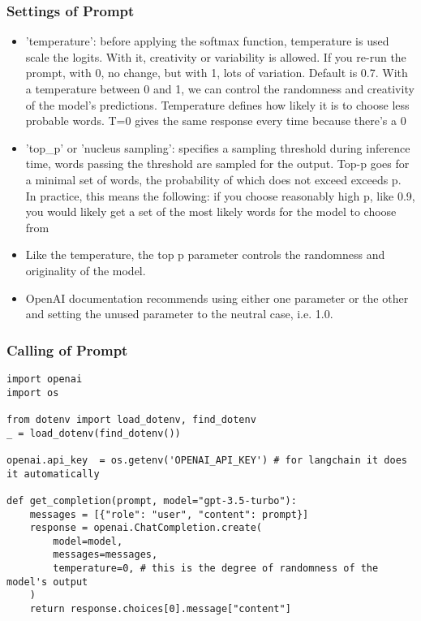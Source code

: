 \begin{frame}[fragile]\frametitle{Settings of Prompt}

\begin{itemize}
\item 'temperature':  before applying the softmax function, temperature is used scale the logits. With it, creativity or variability is allowed. If you re-run the prompt, with 0, no change, but with 1, lots of variation. Default is 0.7. With a temperature between 0 and 1, we can control the randomness and creativity of the model's predictions. Temperature defines how likely it is to choose less probable words. T=0 gives the same response every time because there's a 0%
\item 'top\_p' or 'nucleus sampling': specifies a sampling threshold during inference time, words passing the threshold are sampled for the output. Top-p goes for a minimal set of words, the probability of which does not exceed exceeds p. In practice, this means the following: if you choose reasonably high p, like 0.9, you would likely get a set of the most likely words for the model to choose from
\item Like the temperature, the top p parameter controls the randomness and originality of the model.
\item OpenAI documentation recommends using either one parameter or the other and setting the unused parameter to the neutral case, i.e. 1.0.
\end{itemize}
		
\end{frame}


\begin{frame}[fragile]\frametitle{Calling of Prompt}

\begin{lstlisting}
import openai
import os

from dotenv import load_dotenv, find_dotenv
_ = load_dotenv(find_dotenv())

openai.api_key  = os.getenv('OPENAI_API_KEY') # for langchain it does it automatically

def get_completion(prompt, model="gpt-3.5-turbo"):
    messages = [{"role": "user", "content": prompt}]
    response = openai.ChatCompletion.create(
        model=model,
        messages=messages,
        temperature=0, # this is the degree of randomness of the model's output
    )
    return response.choices[0].message["content"]
\end{lstlisting}
		
\end{frame}

